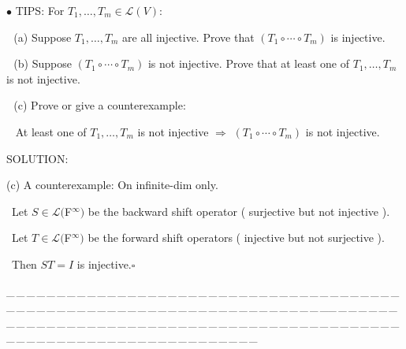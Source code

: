 \documentclass[a4paper, 11pt, UTF8]{article}
\def\Lm{\mathcal{L}}
\begin{document}
\begin{large}
{\small $\bullet$} {\timesbf\Large T{\normalsize IPS}:} {\timessl\Large For $T_1,\dots,T_m\in\Lm(V)$}:\par\,\,
(a) {\timessl\Large Suppose $T_1,\dots,T_m$ are all injective. Prove that $(T_1\circ\cdots\circ T_m)$ is injective.}\par\,\,
(b) {\timessl\Large Suppose $(T_1\circ\cdots\circ T_m)$ is not injective. Prove that at least one of $T_1,\dots,T_m$ is not injective.}\par\,\,
(c) {\timessl\Large Prove or give a counterexample:}\par\quad\,\,\,
{\timessl\Large At least one of $T_1,\dots,T_m$ is not injective $\Rightarrow$ $(T_1\circ\cdots\circ T_m)$ is not injective. }\par
{\timesbf S\footnotesize{OLUTION:}}\par\quad
(c) A counterexample: On infinite-dim only.\par\qquad\,
Let $S\in\Lm(${\timesbf F}$^\infty)$ be the backward shift operator ( surjective but not injective ).\par\qquad\,
Let $T\in\Lm(${\timesbf F}$^\infty)$ be the forward shift operators ( injective but not surjective ).\par\qquad\,
Then $ST=I$ is injective.\quad$\square$\par
{\tiny \_\,\_\,\_\,\_\,\_\,\_\,\_\,\_\,\_\,\_\,\_\,\_\,\_\,\_\,\_\,\_\,\_\,\_\,\_\,\_\,\_\,\_\,\_\,\_\,\_\,\_\,\_\,\_\,\_\,\_\,\_\,\_\,\_\,\_\,\_\,\_\,\_\,\_\,\_\,\_\,\_\,\_\,\_\,\_\,\_\,\_\,\_\,\_\,\_\,\_\,\_\,\_\,\_\,\_\,\_\,\_\,\_\,\_\,\_\,\_\,\_\,\_\,\_\,\_\,\_\,\_\,\_\,\_\,\_\,\_\,\_\_\,\_\,\_\,\_\,\_\,\_\,\_\,\_\,\_\,\_\,\_\,\_\,\_\,\_\,\_\,\_\,\_\,\_\,\_\,\_\,\_\,\_\,\_\,\_\,\_\,\_\,\_\,\_\,\_\,\_\,\_\,\_\,\_\,\_\,\_\,\_\,\_\,\_\,\_\,\_\,\_\,\_\,\_\,\_\,\_\,\_\,\_\,\_\,\_\,\_\,\_\,\_\,\_\,\_\,\_\,\_\,\_\,\_\,\_\,\_\,\_\,\_\,\_\,\_\,\_\,\_\,\_\,\_\,\_\,\_\,\_}\par


\end{large}
\end{document}
